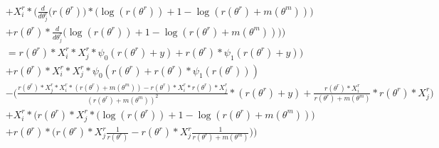 \documentclass[bibliography=totoc,10pt]{scrartcl}
\begin{document}
\begin{equation}
\begin{split}
&+ X^r_{i} * \bigg(  \frac{d}{d \theta^r_j}  \bigg( r(\theta^r) \bigg) * \bigg( \log(r(\theta^r)) + 1 - \log(r(\theta^r)+m(\theta^m)) \bigg) \\
&+ r(\theta^r) * \frac{d}{d \theta^r_j} \bigg( \log(r(\theta^r)) + 1 - \log(r(\theta^r)+m(\theta^m)) \bigg)  \bigg) \\
&= r(\theta^r) * X^r_{i} * X^r_{j} * \psi_0(r(\theta^r)+y) +  r(\theta^r) *  \psi_1(r(\theta^r)+y) ) \\
&+ r(\theta^r) * X^r_{i} * X^r_{j} * \psi_0(r(\theta^r) +  r(\theta^r) *  \psi_1(r(\theta^r)) ) \\
&- \bigg( \frac{r(\theta^r) * X^r_{j} * X^r_{i} *(r(\theta^r)+m(\theta^m)) - r(\theta^r) * X^r_{i}*r(\theta^r) * X^r_{j}}{(r(\theta^r)+m(\theta^m))^2} *(r(\theta^r) + y) + \frac{r(\theta^r) * X^r_{i} }{r(\theta^r)+m(\theta^m)} *r(\theta^r) * X^r_{j} \bigg) \\
&+ X^r_{i} * \bigg(  r(\theta^r) * X^r_{j} * \bigg( \log(r(\theta^r)) + 1 - \log(r(\theta^r)+m(\theta^m)) \bigg) \\
&+ r(\theta^r) * \bigg( r(\theta^r) * X^r_{j} \frac{1}{r(\theta^r)} - r(\theta^r) * X^r_{j} \frac{1}{r(\theta^r)+m(\theta^m)} \bigg)  \bigg) \\
\end{split}
\end{equation}
\end{document}
